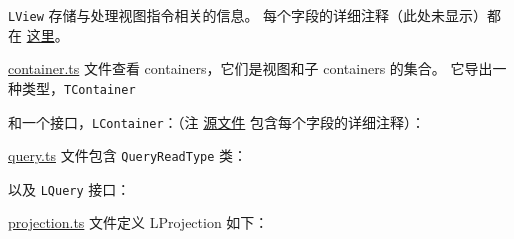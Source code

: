 \texttt{LView} 存储与处理视图指令相关的信息。
每个字段的详细注释（此处未显示）都在
\href{https://github.com/angular/angular/blob/master/packages/core/src/render3/interfaces/view.ts}
{这里}。




\href{https://github.com/angular/angular/blob/0b38a039d0565cfc7beb010a87f897bece0cffde/packages/core/src/render3/interfaces/container.ts}
{container.ts}
文件查看 containers，它们是视图和子 containers 的集合。
它导出一种类型，\texttt{TContainer}




和一个接口，\texttt{LContainer}：（注
\href{https://github.com/angular/angular/blob/0b38a039d0565cfc7beb010a87f897bece0cffde/packages/core/src/render3/interfaces/container.ts}
{源文件}
包含每个字段的详细注释）：




\href{https://github.com/angular/angular/blob/0b38a039d0565cfc7beb010a87f897bece0cffde/packages/core/src/render3/interfaces/query.ts}
{query.ts}
文件包含 \texttt{QueryReadType} 类：




以及 \texttt{LQuery} 接口：




\href{https://github.com/angular/angular/blob/0b38a039d0565cfc7beb010a87f897bece0cffde/packages/core/src/render3/interfaces/projection.ts}
{projection.ts}
文件定义 LProjection 如下：




